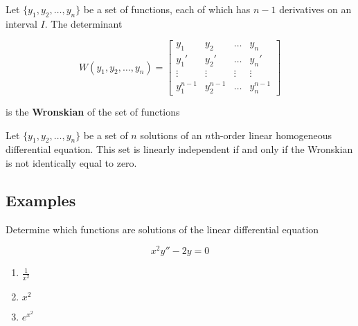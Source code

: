 \documentclass{report}
\begin{document}
\begin{tcolorbox}[title = Definition of the Wronskian of a Set of Functions]
	Let $\{y_1, y_2, \hdots, y_n\}$ be a set of functions, each of which has $n-1$ derivatives	on an interval $I$. The determinant
	
	$$
	W(y_1,y_2,\hdots,y_n) = \begin{bmatrix} y_1 & y_2 & \hdots & y_n \\y_1' & y_2' & \hdots &  y_n' \\ \vdots & \vdots & \vdots  & \vdots \\ y_1^{n-1} & y_2^{n-1} & \hdots & y_n^{n-1} \end{bmatrix}
	$$
	
	is the \textbf{Wronskian} of the set of functions
\end{tcolorbox}

\begin{tcolorbox}[title = Wronskian Test for Linear Independence]
	Let $\{y_1, y_2, \hdots, y_n\}$ be a set of $n$ solutions of an $n$th-order linear homogeneous differential equation. This set is linearly independent if and only if the Wronskian is not identically equal to zero.
\end{tcolorbox}

\subsection{Examples}

\begin{tcolorbox}[colframe = lightred]
	Determine which functions are solutions of the linear differential equation 
	
	$$
	x^2y'' -2y = 0
	$$
	
	\begin{enumerate}
		\item $\frac{1}{x^2}$
		\item $x^2$
		\item $e^{x^2}$
	\end{enumerate}
\end{tcolorbox}
\end{document}
